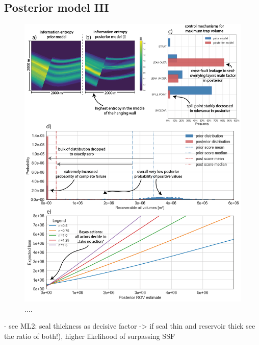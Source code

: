 		\subsection{Posterior model III}%
		\begin{figure}[p!]
			\centering
			\includegraphics[width=1\textwidth]{Figures/ML2}
			\caption{....}\label{fig:ML2}
		\end{figure}
		- see ML2: seal thickness as decisive factor
			-> if seal thin and reservoir thick see the ratio of both!), higher likelihood of surpassing SSF
		